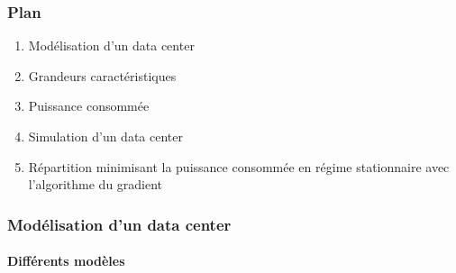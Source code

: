\documentclass[a4paper,11pt]{beamer}
\begin{document}
\begin{frame}
    \frametitle{Plan}
    \begin{enumerate}
        \item Modélisation d'un data center
        \item Grandeurs caractéristiques
        \item Puissance consommée
        \item Simulation d'un data center
        \item Répartition minimisant la puissance consommée en régime stationnaire avec l'algorithme du gradient
    \end{enumerate}
\end{frame}

\begin{frame}
    \frametitle{Modélisation d'un data center}
    \framesubtitle{Différents modèles}


\end{frame}
\end{document}
